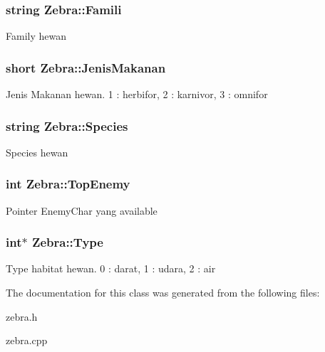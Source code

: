 \subsubsection[{\texorpdfstring{Famili}{Famili}}]{\setlength{\rightskip}{0pt plus 5cm}string Zebra\+::\+Famili\hspace{0.3cm}{\ttfamily [protected]}}\hypertarget{class_zebra_afd28ca34e1bbf0e7ef6ae41f697345d2}{}\label{class_zebra_afd28ca34e1bbf0e7ef6ae41f697345d2}
Family hewan 
\subsubsection[{\texorpdfstring{Jenis\+Makanan}{JenisMakanan}}]{\setlength{\rightskip}{0pt plus 5cm}short Zebra\+::\+Jenis\+Makanan\hspace{0.3cm}{\ttfamily [protected]}}\hypertarget{class_zebra_af50d97630fd5fdbb3cb7f977e8689575}{}\label{class_zebra_af50d97630fd5fdbb3cb7f977e8689575}
Jenis Makanan hewan. 1 \+: herbifor, 2 \+: karnivor, 3 \+: omnifor 
\subsubsection[{\texorpdfstring{Species}{Species}}]{\setlength{\rightskip}{0pt plus 5cm}string Zebra\+::\+Species\hspace{0.3cm}{\ttfamily [protected]}}\hypertarget{class_zebra_a0d6e5b92efa4df0f092caf24c5015491}{}\label{class_zebra_a0d6e5b92efa4df0f092caf24c5015491}
Species hewan 
\subsubsection[{\texorpdfstring{Top\+Enemy}{TopEnemy}}]{\setlength{\rightskip}{0pt plus 5cm}int Zebra\+::\+Top\+Enemy\hspace{0.3cm}{\ttfamily [protected]}}\hypertarget{class_zebra_a0d13a21f03c66cc28a7b1085f4e05449}{}\label{class_zebra_a0d13a21f03c66cc28a7b1085f4e05449}
Pointer Enemy\+Char yang available 
\subsubsection[{\texorpdfstring{Type}{Type}}]{\setlength{\rightskip}{0pt plus 5cm}int$\ast$ Zebra\+::\+Type\hspace{0.3cm}{\ttfamily [protected]}}\hypertarget{class_zebra_a6794a0b724c4bc903f225b9b0a04c841}{}\label{class_zebra_a6794a0b724c4bc903f225b9b0a04c841}
Type habitat hewan. 0 \+: darat, 1 \+: udara, 2 \+: air 

The documentation for this class was generated from the following files\+:\begin{DoxyCompactItemize}
\item 
zebra.\+h\item 
zebra.\+cpp\end{DoxyCompactItemize}
